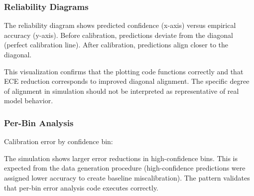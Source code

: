 \subsubsection{Reliability Diagrams}

The reliability diagram shows predicted confidence (x-axis) versus empirical accuracy (y-axis). Before calibration, predictions deviate from the diagonal (perfect calibration line). After calibration, predictions align closer to the diagonal.

This visualization confirms that the plotting code functions correctly and that ECE reduction corresponds to improved diagonal alignment. The specific degree of alignment in simulation should not be interpreted as representative of real model behavior.

\subsubsection{Per-Bin Analysis}

Calibration error by confidence bin:

\begin{table}[htbp]
\centering
{}
\end{table}

The simulation shows larger error reductions in high-confidence bins. This is expected from the data generation procedure (high-confidence predictions were assigned lower accuracy to create baseline miscalibration). The pattern validates that per-bin error analysis code executes correctly.


